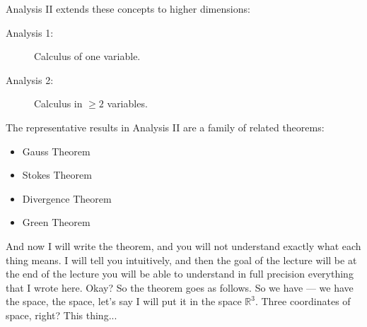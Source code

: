 \begin{math-stroke}
Analysis II extends these concepts to higher dimensions:
\begin{description}
    \item[Analysis 1:] Calculus of one variable.
    \item[Analysis 2:] Calculus in $\ge 2$ variables.
\end{description}
The representative results in Analysis II are a family of related theorems:
\begin{itemize}
    \item Gauss Theorem
    \item Stokes Theorem
    \item Divergence Theorem
    \item Green Theorem
\end{itemize}
\end{math-stroke}

\begin{spoken-clean}[00:10:32 - 00:11:00]
And now I will write the theorem, and you will not understand exactly what each thing means. I will tell you intuitively, and then the goal of the lecture will be at the end of the lecture you will be able to understand in full precision everything that I wrote here. Okay? So the theorem goes as follows. So we have — we have the space, the space, let's say I will put it in the space $\mathbb{R}^3$. Three coordinates of space, right? This thing... 
\end{spoken-clean}

\begin{math-stroke}
\begin{center}
\end{center}
\end{math-stroke}

